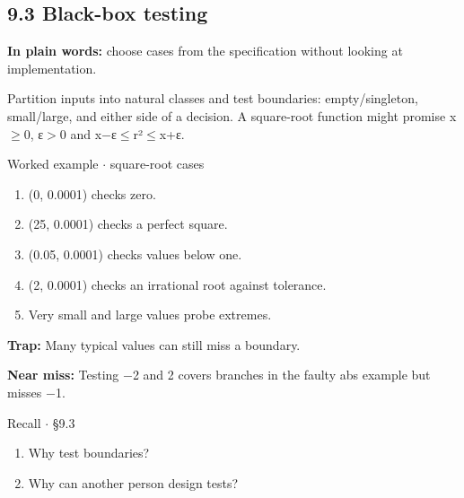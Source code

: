 \documentclass[11pt]{article}
\begin{document}
\begin{keepsection}
\section{9.3 Black-box testing}

\begin{plainbox}\textbf{In plain words:} choose cases from the specification without looking at implementation.\end{plainbox}

Partition inputs into natural classes and test boundaries: empty/singleton, small/large, and either side of a decision. A square-root function might promise x\ensuremath{\geq}0, ε\ensuremath{>}0 and x\ensuremath{-}ε\ensuremath{\leq}r²\ensuremath{\leq}x+ε.

\begin{workedbox}{Worked example \ensuremath{\cdot} square-root cases}
\begin{enumerate}
\item (0, 0.0001) checks zero.
\item (25, 0.0001) checks a perfect square.
\item (0.05, 0.0001) checks values below one.
\item (2, 0.0001) checks an irrational root against tolerance.
\item Very small and large values probe extremes.
\end{enumerate}
\end{workedbox}

\begin{notebox}\textbf{Trap:} Many typical values can still miss a boundary.\end{notebox}

\begin{notebox}\textbf{Near miss:} Testing \ensuremath{-}2 and 2 covers branches in the faulty abs example but misses \ensuremath{-}1.\end{notebox}

\begin{recallbox}{Recall \ensuremath{\cdot} §9.3}
\begin{enumerate}
\item Why test boundaries?
\item Why can another person design tests?
\end{enumerate}

\end{recallbox}
\end{keepsection}
\end{document}
